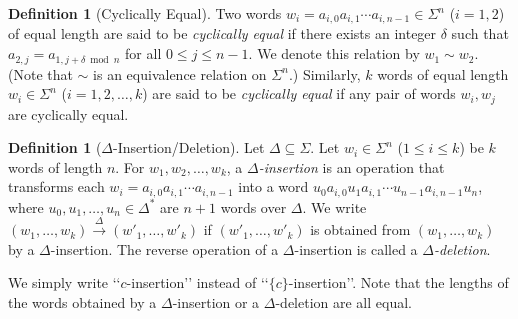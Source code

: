 \documentclass{article}
\theoremstyle{definition}
\newtheorem{definition}[theorem]{Definition}
\newcommand{\cequal}{\sim}
\newcommand{\insto}[1]{\overset{{#1}}{\to}}
\begin{document}
\begin{definition}[Cyclically Equal]
    \label{def:cyclically_equal}
    Two words $w_i = a_{i,0} a_{i,1} \cdots a_{i,n-1} \in \Sigma^n$ ($i = 1,2$) of equal length are said to be \emph{cyclically equal} if there exists an integer $\delta$ such that $a_{2,j} = a_{1,j + \delta \bmod n}$ for all $0 \leq j \leq n-1$.
    We denote this relation by $w_1 \cequal w_2$.
    (Note that $\cequal$ is an equivalence relation on $\Sigma^n$.)
    Similarly, $k$ words of equal length $w_i \in \Sigma^n$ ($i = 1,2,\dots,k$) are said to be \emph{cyclically equal} if any pair of words $w_i, w_j$ are cyclically equal.
\end{definition}

\begin{definition}[$\Delta$-Insertion/Deletion]
    \label{def:Delta-insertion}
    Let $\Delta \subseteq \Sigma$.
    Let $w_i \in \Sigma^n$ ($1 \leq i \leq k$) be $k$ words of length $n$. 
    For $w_1, w_2, \dots, w_k$, a \emph{$\Delta$-insertion} is an operation that transforms each $w_i = a_{i,0} a_{i,1} \cdots a_{i,n-1}$ into a word $u_0 a_{i,0} u_1 a_{i,1} \cdots u_{n-1} a_{i,n-1} u_n$, where $u_0,u_1,\dots,u_n \in \Delta^*$ are $n+1$ words over $\Delta$. 
    We write $(w_1,\dots,w_k)\insto{\Delta} (w'_1,\dots,w'_k)$ if $(w'_1,\dots,w'_k)$ is obtained from $(w_1,\dots,w_k)$ by a $\Delta$-insertion. 
    The reverse operation of a $\Delta$-insertion is called a \emph{$\Delta$-deletion}. 
\end{definition}

We simply write \lq\lq $c$-insertion\rq\rq{} instead of {}\lq\lq $\{c\}$-insertion\rq\rq{}.
Note that the lengths of the words obtained by a $\Delta$-insertion or a $\Delta$-deletion are all equal.
\end{document}
